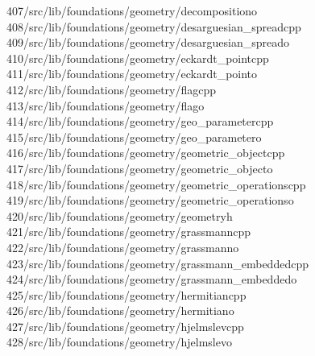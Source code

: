 \begin{tabbing}
407\>/src/lib/foundations/geometry/decompositiono\\[0pt]
408\>/src/lib/foundations/geometry/desarguesian\_spreadcpp\\[0pt]
409\>/src/lib/foundations/geometry/desarguesian\_spreado\\[0pt]
410\>/src/lib/foundations/geometry/eckardt\_pointcpp\\[0pt]
411\>/src/lib/foundations/geometry/eckardt\_pointo\\[0pt]
412\>/src/lib/foundations/geometry/flagcpp\\[0pt]
413\>/src/lib/foundations/geometry/flago\\[0pt]
414\>/src/lib/foundations/geometry/geo\_parametercpp\\[0pt]
415\>/src/lib/foundations/geometry/geo\_parametero\\[0pt]
416\>/src/lib/foundations/geometry/geometric\_objectcpp\\[0pt]
417\>/src/lib/foundations/geometry/geometric\_objecto\\[0pt]
418\>/src/lib/foundations/geometry/geometric\_operationscpp\\[0pt]
419\>/src/lib/foundations/geometry/geometric\_operationso\\[0pt]
420\>/src/lib/foundations/geometry/geometryh\\[0pt]
421\>/src/lib/foundations/geometry/grassmanncpp\\[0pt]
422\>/src/lib/foundations/geometry/grassmanno\\[0pt]
423\>/src/lib/foundations/geometry/grassmann\_embeddedcpp\\[0pt]
424\>/src/lib/foundations/geometry/grassmann\_embeddedo\\[0pt]
425\>/src/lib/foundations/geometry/hermitiancpp\\[0pt]
426\>/src/lib/foundations/geometry/hermitiano\\[0pt]
427\>/src/lib/foundations/geometry/hjelmslevcpp\\[0pt]
428\>/src/lib/foundations/geometry/hjelmslevo\\[0pt]

\end{tabbing}
